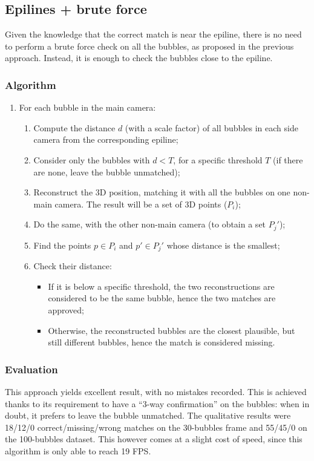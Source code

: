 \subsection{Epilines + brute force}
\label{sec:match:epi-bruteforce}

Given the knowledge that the correct match is near the epiline, there is no need to perform a brute force check on all the bubbles, as proposed in the previous approach.
Instead, it is enough to check the bubbles close to the epiline.

\subsubsection{Algorithm}

\begin{enumerate}
	\itemsep 0em
	\item For each bubble in the main camera:
	      \begin{enumerate}
		      \item Compute the distance $d$ (with a scale factor) of all bubbles in each side camera from the corresponding epiline;
		      \item Consider only the bubbles with $d<T$, for a specific threshold $T$ (if there are none, leave the bubble unmatched);
		      \item Reconstruct the 3D position, matching it with all the bubbles on one non-main camera. The result will be a set of 3D points ($P_i$);
		      \item Do the same, with the other non-main camera (to obtain a set $P_j'$);
		      \item Find the points $p\in P_i$ and $p'\in P_j'$ whose distance is the smallest;
		      \item Check their distance:
		            \begin{itemize}
			            \item If it is below a specific threshold, the two reconstructions are considered to be the same bubble, hence the two matches are approved;
			            \item Otherwise, the reconstructed bubbles are the closest plausible, but still different bubbles, hence the match is considered missing.
		            \end{itemize}
	      \end{enumerate}
\end{enumerate}

\subsubsection{Evaluation}

This approach yields excellent result, with no mistakes recorded.
This is achieved thanks to its requirement to have a ``3-way confirmation'' on the bubbles: when in doubt, it prefers to leave the bubble unmatched.
The qualitative results were 18/12/0 correct/missing/wrong matches on the 30-bubbles frame and 55/45/0 on the 100-bubbles dataset.
This however comes at a slight cost of speed, since this algorithm is only able to reach 19 FPS.
